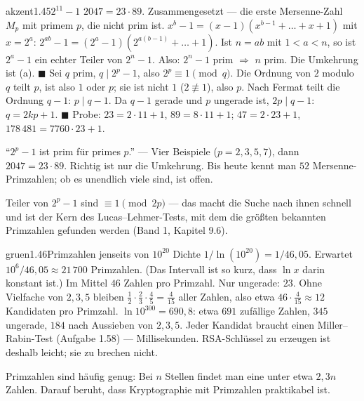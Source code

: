\begin{loesungkarte}{akzent}{1.45}{$2^{11} - 1$}
$2047 = 23\cdot89$. Zusammengesetzt --- die erste Mersenne-Zahl $M_p$ mit primem $p$, die nicht prim ist.
$x^{b} - 1 = (x - 1)(x^{b-1} + \dots + x + 1)$ mit $x = 2^{a}$: $2^{ab} - 1 = (2^{a} - 1)(2^{a(b-1)} + \dots + 1)$. Ist $n = ab$ mit $1 < a < n$, so ist $2^{a} - 1$ ein echter Teiler von $2^{n} - 1$. Also: $2^{n} - 1$ prim $\Rightarrow$ $n$ prim. Die Umkehrung ist (a). $\blacksquare$
Sei $q$ prim, $q\mid2^{p} - 1$, also $2^{p}\equiv1\pmod q$. Die Ordnung von $2$ modulo $q$ teilt $p$, ist also $1$ oder $p$; sie ist nicht $1$ ($2\not\equiv1$), also $p$. Nach Fermat teilt die Ordnung $q - 1$: $p\mid q - 1$. Da $q - 1$ gerade und $p$ ungerade ist, $2p\mid q - 1$: $q = 2kp + 1$. $\blacksquare$ Probe: $23 = 2\cdot11 + 1$, $89 = 8\cdot11 + 1$; $47 = 2\cdot23 + 1$, $178\,481 = 7760\cdot23 + 1$. \checkmark
\begin{fehler}\kastentext
\enquote{$2^{p} - 1$ ist prim für primes $p$.} --- Vier Beispiele ($p = 2, 3, 5, 7$), dann $2047 = 23\cdot89$. Richtig ist nur die Umkehrung. Bis heute kennt man $52$ Mersenne-Primzahlen; ob es unendlich viele sind, ist offen.
\end{fehler}
\begin{mitnehmen}\kastentext
Teiler von $2^{p} - 1$ sind $\equiv1\pmod{2p}$ --- das macht die Suche nach ihnen schnell und ist der Kern des Lucas--Lehmer-Tests, mit dem die größten bekannten Primzahlen gefunden werden (Band 1, Kapitel 9.6).
\end{mitnehmen}
\end{loesungkarte}

\begin{loesungkarte}{gruen}{1.46}{Primzahlen jenseits von $10^{20}$}
Dichte $1/\ln(10^{20}) = 1/46{,}05$. Erwartet $10^{6}/46{,}05\approx21\,700$ Primzahlen. (Das Intervall ist so kurz, dass $\ln x$ darin konstant ist.)
Im Mittel $46$ Zahlen pro Primzahl. Nur ungerade: $23$. Ohne Vielfache von $2, 3, 5$ bleiben $\frac12\cdot\frac23\cdot\frac45 = \frac4{15}$ aller Zahlen, also etwa $46\cdot\frac4{15}\approx12$ Kandidaten pro Primzahl.
$\ln10^{300} = 690{,}8$: etwa $691$ zufällige Zahlen, $345$ ungerade, $184$ nach Aussieben von $2, 3, 5$. Jeder Kandidat braucht einen Miller--Rabin-Test (Aufgabe 1.58) --- Millisekunden. RSA-Schlüssel zu erzeugen ist deshalb leicht; sie zu brechen nicht.
\begin{mitnehmen}\kastentext
Primzahlen sind häufig genug: Bei $n$ Stellen findet man eine unter etwa $2{,}3n$ Zahlen. Darauf beruht, dass Kryptographie mit Primzahlen praktikabel ist.
\end{mitnehmen}
\end{loesungkarte}

